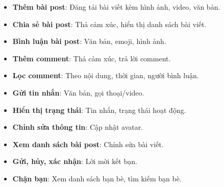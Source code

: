 
\vspace{0.5cm} %

\begin{itemize}
    \renewcommand{\labelitemi}{-} %
    \item \textbf{Thêm bài post}: Đăng tải bài viết kèm hình ảnh, video, văn bản.
    \item \textbf{Chia sẻ bài post}: Thả cảm xúc, hiển thị danh sách bài viết.
    \item \textbf{Bình luận bài post}: Văn bản, emoji, hình ảnh.
\end{itemize}

\vspace{0.3cm}

\begin{itemize}
    \renewcommand{\labelitemi}{-}
    \item \textbf{Thêm comment}: Thả cảm xúc, trả lời comment.
    \item \textbf{Lọc comment}: Theo nội dung, thời gian, người bình luận.
\end{itemize}

\vspace{0.3cm}

\begin{itemize}
    \renewcommand{\labelitemi}{-}
    \item \textbf{Gửi tin nhắn}: Văn bản, gọi thoại/video.
    \item \textbf{Hiển thị trạng thái}: Tin nhắn, trạng thái hoạt động.
\end{itemize}

\vspace{0.3cm}

\begin{itemize}
    \renewcommand{\labelitemi}{-}
    \item \textbf{Chỉnh sửa thông tin}: Cập nhật avatar.
    \item \textbf{Xem danh sách bài post}: Chỉnh sửa bài viết.
\end{itemize}

\vspace{0.3cm}

\begin{itemize}
    \renewcommand{\labelitemi}{-}
    \item \textbf{Gửi, hủy, xác nhận}: Lời mời kết bạn.
    \item \textbf{Chặn bạn}: Xem danh sách bạn bè, tìm kiếm bạn bè.
\end{itemize}
